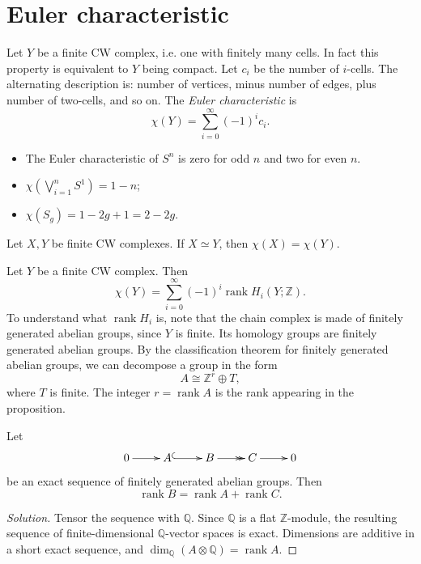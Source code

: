 \section{Euler characteristic}
\label{section-euler-characteristic}

Let $Y$ be a finite CW complex, i.e. one with
finitely many
cells. In fact this property is equivalent to
$Y$ being
compact. Let $c_i$ be the number of
$i$-cells.
The alternating description is: number of
vertices, minus number of edges, plus number
of two-cells, and so on. The
\emph{Euler characteristic} is
$$
\chi(Y)=\sum_{i=0}^{\infty}(-1)^ic_i.
$$

\begin{example}
\begin{itemize}
\item The Euler characteristic of $S^n$ is
zero for odd $n$ and two for even $n$.
\item $\chi(\bigvee_{i=1}^nS^1)=1-n$;
\item $\chi(S_g)=1-2g+1=2-2g$.
\end{itemize}
\end{example}

\begin{theorem}
Let $X,Y$ be finite CW complexes. If $X\simeq
Y$, then
$\chi(X)=\chi(Y)$.
\end{theorem}

\begin{proposition}
Let $Y$ be a finite CW complex. Then
$$
\chi(Y)=\sum_{i=0}^{\infty}(-1)^i
\operatorname{rank}
H_i(Y;\mathbb{Z}).
$$
To understand what $\operatorname{rank} H_i$
is, note that the chain complex
is made of finitely generated abelian groups,
since $Y$ is
finite. Its homology groups are finitely
generated abelian groups. By the
classification
theorem for finitely generated abelian
groups, we can
decompose a group in the form
$$
A\cong\mathbb{Z}^r\oplus T,
$$
where $T$ is finite. The integer
$r=\operatorname{rank}A$ is the rank
appearing
in the proposition.
\end{proposition}

\begin{exercise}
Let
$$
\xymatrix{
0 \ar[r]
 & A \ar@{^{(}->}[r]
 & B \ar@{->>}[r]
 & C \ar[r]
 & 0
}
$$
be an exact sequence of finitely generated
abelian groups.
Then
$$
\operatorname{rank}B=
\operatorname{rank}A+
\operatorname{rank}C.
$$
\begin{proof}[Solution]
Tensor the sequence with $\mathbb{Q}$. Since
$\mathbb{Q}$ is a flat $\mathbb{Z}$-module,
the resulting sequence of finite-dimensional
$\mathbb{Q}$-vector spaces is exact.
Dimensions
are additive in a short exact sequence, and
$\dim_{\mathbb{Q}}(A\otimes\mathbb{Q})
=\operatorname{rank}A$.
\end{proof}
\end{exercise}


